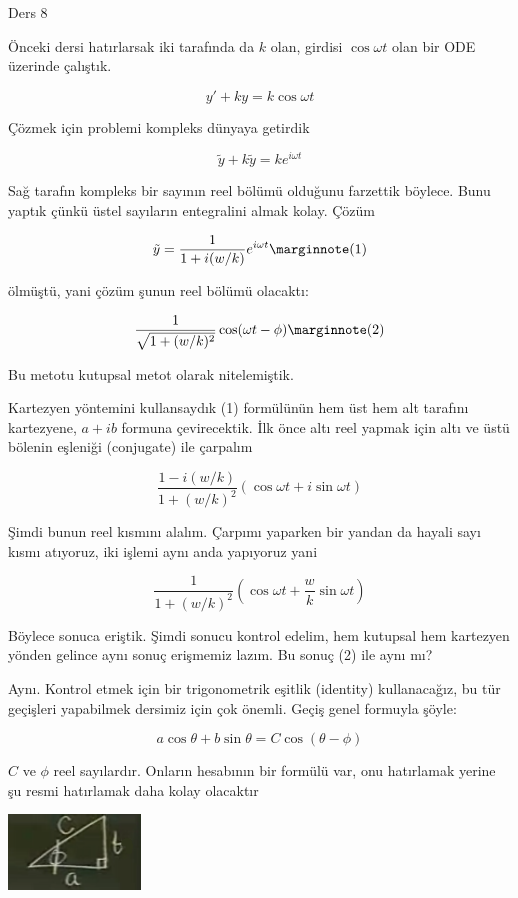 \documentclass[12pt,fleqn]{article}\usepackage{../../common}
\begin{document}
Ders 8

Önceki dersi hatırlarsak iki tarafında da $k$ olan, girdisi $\cos \omega t$
olan bir ODE üzerinde çalıştık. 

$$ y' + ky = k \cos \omega t $$

Çözmek için problemi kompleks dünyaya getirdik

$$ \tilde{y} + k\tilde{y} = ke^{i\omega t} $$

Sağ tarafın kompleks bir sayının reel bölümü olduğunu farzettik
böylece. Bunu yaptık çünkü üstel sayıların entegralini almak kolay. Çözüm

$$
\tilde{y} = \frac{1}{1+i(w/k)} e^{i\omega t} 
\mlabel{1}
$$

ölmüştü, yani çözüm şunun reel bölümü olacaktı:

$$
\frac{1}{\sqrt{1+(w/k)^2}} \cos(\omega t - \phi) 
\mlabel{2}
$$

Bu metotu kutupsal metot olarak nitelemiştik. 

Kartezyen yöntemini kullansaydık (1) formülünün hem üst hem alt
tarafını kartezyene, $a+ib$ formuna çevirecektik. İlk önce altı reel yapmak
için altı ve üstü bölenin eşleniği (conjugate) ile çarpalım

$$ \frac{1-i(w/k)}{1+(w/k)^2} (\cos \omega t + i\sin \omega t)$$

Şimdi bunun reel kısmını alalım. Çarpımı yaparken bir yandan da hayali sayı
kısmı atıyoruz, iki işlemi aynı anda yapıyoruz yani

$$ \frac{1}{1+(w/k)^2} (\cos \omega t + \frac{w}{k} \sin \omega t )$$

Böylece sonuca eriştik. Şimdi sonucu kontrol edelim, hem kutupsal hem
kartezyen yönden gelince aynı sonuç erişmemiz lazım. Bu sonuç (2)
ile aynı mı?

Aynı. Kontrol etmek için bir trigonometrik eşitlik (identity) kullanacağız,
bu tür geçişleri yapabilmek dersimiz için çok önemli. Geçiş genel formuyla
şöyle:

$$ a \cos \theta + b \sin \theta = C \cos(\theta - \phi)$$

$C$ ve $\phi$ reel sayılardır. Onların hesabının bir formülü var, onu
hatırlamak yerine şu resmi hatırlamak daha kolay olacaktır

\includegraphics[height=2cm]{8_1.png}
\end{document}
